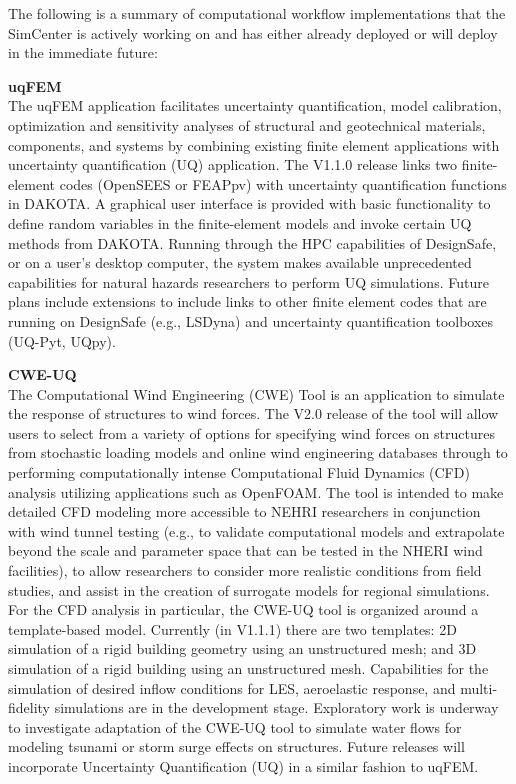 The following is a summary of computational workflow implementations that the SimCenter is actively working on and has either already deployed or will deploy in the immediate future:
\newline

\noindent\textbf{uqFEM} \\The uqFEM application facilitates uncertainty quantification, model calibration, optimization and sensitivity analyses of structural and geotechnical materials, components, and systems by combining existing finite element applications with uncertainty quantification (UQ) application. The V1.1.0 release links two finite-element codes (OpenSEES or FEAPpv) with uncertainty quantification functions in DAKOTA. A graphical user interface is provided with basic functionality to define random variables in the finite-element models and invoke certain UQ methods from DAKOTA. Running through the HPC capabilities of DesignSafe, or on a user’s desktop computer, the system makes available unprecedented capabilities for natural hazards researchers to perform UQ simulations. Future plans include extensions to include links to other finite element codes that are running on DesignSafe (e.g., LSDyna) and uncertainty quantification toolboxes (UQ-Pyt, UQpy).
\newline

\noindent\textbf{CWE-UQ} \\The Computational Wind Engineering (CWE) Tool is an application to simulate the response of structures to wind forces. The V2.0 release of the tool will allow users to select from a variety of options for specifying wind forces on structures from stochastic loading models and online wind engineering databases through to performing computationally intense Computational Fluid Dynamics (CFD) analysis utilizing applications such as OpenFOAM. The tool is intended to make detailed CFD modeling more accessible to NEHRI researchers in conjunction with wind tunnel testing (e.g., to validate computational models and extrapolate beyond the scale and parameter space that can be tested in the NHERI wind facilities), to allow researchers to consider more realistic conditions from field studies, and assist in the creation of surrogate models for regional simulations. For the CFD analysis in particular, the CWE-UQ tool is organized around a template-based model. Currently (in V1.1.1) there are two templates: 2D simulation of a rigid building geometry using an unstructured mesh; and 3D simulation of a rigid building using an unstructured mesh. Capabilities for the simulation of desired inflow conditions for LES, aeroelastic response, and multi-fidelity simulations are in the development stage. 
Exploratory work is underway to investigate adaptation of the CWE-UQ tool to simulate water flows for modeling tsunami or storm surge effects on structures. Future releases will incorporate Uncertainty Quantification (UQ) in a similar fashion to uqFEM.
\newline

